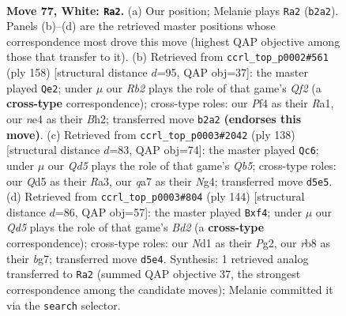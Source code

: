 \documentclass[11pt]{article}
\begin{document}
\clearpage

\begin{figure}[p]\centering
\begin{subfigure}{0.46\textwidth}\centering
\resizebox{\linewidth}{!}{%
\newchessgame
\chessboard[
  setfen={1r6/q5k1/5b2/P1pQ1p2/3pnPp1/8/1R1BP3/3NK3 w - - 14 77},
  showmover=false,
  pgfstyle=straightmove, color=movearrow, markmove={b2-a2}
]}
\caption{}
\end{subfigure}\hfill
\begin{subfigure}{0.46\textwidth}\centering
\resizebox{\linewidth}{!}{%
\newchessgame
\chessboard[
  setfen={8/2q3pk/4pb2/2p1n3/1rN1P2p/7P/5QPB/R6K w - - 15 80},
  showmover=false,
  pgfstyle=straightmove, color=movearrow, markmove={f2-e2}
]}
\caption{}
\end{subfigure}
\\[4pt]
\begin{subfigure}{0.46\textwidth}\centering
\resizebox{\linewidth}{!}{%
\newchessgame
\chessboard[
  setfen={4qr1k/8/1p1p3P/bQnPpBp1/4P1N1/R7/5PK1/8 w - - 7 70},
  showmover=false,
  pgfstyle=straightmove, color=movearrow, markmove={b5-c6}
]}
\caption{}
\end{subfigure}\hfill
\begin{subfigure}{0.46\textwidth}\centering
\resizebox{\linewidth}{!}{%
\newchessgame
\chessboard[
  setfen={3rq1k1/6b1/3P1p2/4pQ1p/2p1Pn2/1p4R1/3B2PK/1B6 w - - 3 73},
  showmover=false,
  pgfstyle=straightmove, color=movearrow, markmove={d2-f4}
]}
\caption{}
\end{subfigure}
\caption{\textbf{Move 77, White: \texttt{Ra2}.} (a) Our position; Melanie plays \texttt{Ra2} (\texttt{b2a2}). Panels (b)--(d) are the retrieved master positions whose correspondence most drove this move (highest QAP objective among those that transfer to it). (b) Retrieved from \texttt{ccrl\_top\_p0002\#561} (ply 158) [structural distance $d$=95, QAP obj=37]: the master played \texttt{Qe2}; under $\mu$ our \emph{Rb2} plays the role of that game's \emph{Qf2} (a \textbf{cross-type} correspondence); cross-type roles: our \emph{P}f4 as their \emph{R}a1, our \emph{n}e4 as their \emph{B}h2; transferred move \texttt{b2a2} \textbf{(endorses this move)}. (c) Retrieved from \texttt{ccrl\_top\_p0003\#2042} (ply 138) [structural distance $d$=83, QAP obj=74]: the master played \texttt{Qc6}; under $\mu$ our \emph{Qd5} plays the role of that game's \emph{Qb5}; cross-type roles: our \emph{Q}d5 as their \emph{R}a3, our \emph{q}a7 as their \emph{N}g4; transferred move \texttt{d5e5}. (d) Retrieved from \texttt{ccrl\_top\_p0003\#804} (ply 144) [structural distance $d$=86, QAP obj=57]: the master played \texttt{Bxf4}; under $\mu$ our \emph{Qd5} plays the role of that game's \emph{Bd2} (a \textbf{cross-type} correspondence); cross-type roles: our \emph{N}d1 as their \emph{P}g2, our \emph{r}b8 as their \emph{b}g7; transferred move \texttt{d5e4}. Synthesis: 1 retrieved analog transferred to \texttt{Ra2} (summed QAP objective 37, the strongest correspondence among the candidate moves); Melanie committed it via the \texttt{search} selector.}
\label{fig:thought-m152}
\end{figure}
\end{document}
